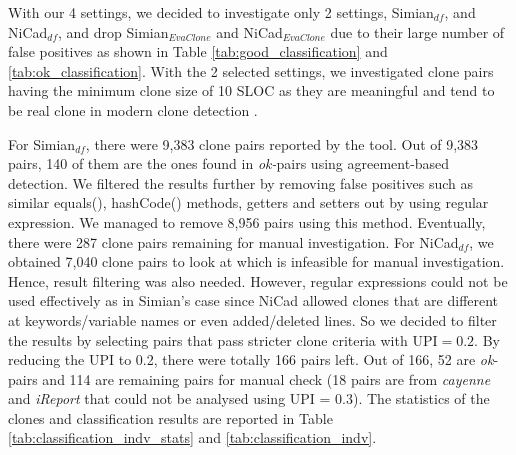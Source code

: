 \documentclass{sig-alternate-05-2015}
\begin{document}
With our 4 settings, we decided to investigate only 2 settings, Simian$_{df}$, and NiCad$_{df}$, and drop Simian$_{\mathrm{\textit{EvaClone}}}$ and NiCad$_{\mathrm{\textit{EvaClone}}}$ due to their large number of false positives as shown in Table \ref{tab:good_classification} and \ref{tab:ok_classification}. With the 2 selected settings, we investigated clone pairs having the minimum clone size of 10 SLOC as they are meaningful and tend to be real clone in modern clone detection \cite{Sajnani2016}. 

For Simian$_{df}$, there were 9,383 clone pairs reported by the tool. Out of 9,383 pairs, 140 of them are the ones found in \textit{ok-}pairs using agreement-based detection. We filtered the results further by removing false positives such as similar equals(), hashCode() methods, getters and setters out by using regular expression. We managed to remove 8,956 pairs using this method. Eventually, there were 287 clone pairs remaining for manual investigation. For NiCad$_{df}$, we obtained 7,040 clone pairs to look at which is infeasible for manual investigation. Hence, result filtering was also needed. However, regular expressions could not be used effectively as in Simian's case since NiCad allowed clones that are different at keywords/variable names or even added/deleted lines. So we decided to filter the results by selecting pairs that pass stricter clone criteria with $\mathrm{UPI} = 0.2$. By reducing the UPI to 0.2, there were totally 166 pairs left. Out of 166, 52 are \textit{ok}-pairs and 114 are remaining pairs for manual check (18 pairs are from \textit{cayenne} and \textit{iReport} that could not be analysed using UPI = 0.3). The statistics of the clones and classification results are reported in Table \ref{tab:classification_indv_stats} and \ref{tab:classification_indv}.

\end{document}
